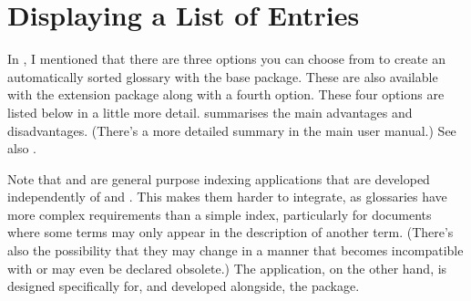 \documentclass[titlepage=false,oneside,
 fontsize=12pt,captions=tableheading]{scrarticle}
\begin{document}
\section{Displaying a List of Entries}
\label{sec:printglossaries}

In , I mentioned that there are three options
you can choose from to create an automatically sorted glossary with the base 
 package. These are also available with the
extension package  along with a fourth
option. These four options are listed below in a little more detail.
 summarises the main advantages and
disadvantages.  (There's a more detailed summary in the main
 user manual.) See also
.

Note that  and  are general purpose
indexing applications that are developed independently of
 and . This makes them harder
to integrate, as glossaries have more complex requirements than a
simple index, particularly for documents where some terms may only
appear in the description of another term. (There's also the
possibility that they may change in a manner that becomes
incompatible with  or may even be declared obsolete.)
The  application, on the other hand, is designed
specifically for, and developed alongside, the
 package.
\end{document}
